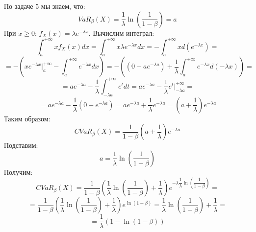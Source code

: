 \documentclass[a4paper,14pt]{extarticle}
\theoremstyle{definition}
\begin{document}
По задаче 5 мы знаем, что:
$$
VaR_\beta(X)=\dfrac{1}{\lambda} \ln \left(\dfrac{1}{1-\beta}\right)=a
$$
При $x\geq 0$: $f_X(x)=\lambda e^{-\lambda x}$.
Вычислим интеграл:
$$
\int_{a}^{+\infty} x f_X(x) dx = \int_{a}^{+\infty} x \lambda e^{-\lambda x} dx
= - \int_{a}^{+\infty} x d(e^{-\lambda x}) = 
$$
$$
= - \left(x e^{-\lambda x} \vert_{a}^{+\infty} - \int_{a}^{+\infty} e^{-\lambda x} dx \right) =
- \left( (0-a e^{-\lambda a}) + \dfrac{1}{\lambda} \int_{a}^{+\infty} e^{-\lambda x} d(-\lambda x) \right) =
$$
$$
= a e^{-\lambda a} - \dfrac{1}{\lambda} \int_{-\lambda a}^{+\infty} e^{t} dt
= a e^{-\lambda a} - \dfrac{1}{\lambda} e^t \vert_{-\lambda a}^{+\infty} = 
$$
$$
=a e^{-\lambda a} - \dfrac{1}{\lambda} (0 - e^{-\lambda a}) =
a e^{-\lambda a} + \dfrac{1}{\lambda} e^{-\lambda a} = \left( a + \dfrac{1}{\lambda} \right) e^{-\lambda a}
$$
Таким образом:
$$
CVaR_\beta(X) =  \dfrac{1}{1-\beta} \left( a + \dfrac{1}{\lambda} \right) e^{-\lambda a}
$$
Подставим: 
$$
a = \dfrac{1}{\lambda} \ln \left(\dfrac{1}{1-\beta}\right)
$$
Получим:
$$
CVaR_\beta(X) =  \dfrac{1}{1-\beta} \left( \dfrac{1}{\lambda} \ln \left(\dfrac{1}{1-\beta}\right) 
+ \dfrac{1}{\lambda} \right) e^{-\lambda \dfrac{1}{\lambda} \ln \left(\dfrac{1}{1-\beta}\right)} =  
$$
$$
=\dfrac{1}{1-\beta} \left( \dfrac{1}{\lambda} \ln \left(\dfrac{1}{1-\beta}\right) 
+ \dfrac{1}{\lambda} \right) e^{\ln (1-\beta)} = \dfrac{1}{\lambda} \ln \left(\dfrac{1}{1-\beta}\right) 
+ \dfrac{1}{\lambda} = 
$$
$$
= \dfrac{1}{\lambda} (1-\ln(1-\beta))
$$
\end{document}
